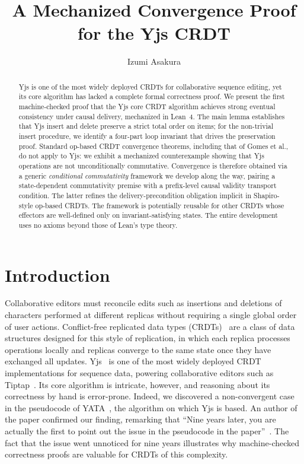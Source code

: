 \documentclass[sigplan,screen]{acmart}
\author{Izumi Asakura}
\begin{document}
\title{A Mechanized Convergence Proof for the Yjs CRDT}

\begin{abstract}
Yjs is one of the most widely deployed CRDTs for collaborative sequence
editing, yet its core algorithm has lacked a complete formal correctness
proof.  We present the first machine-checked proof that the Yjs core
CRDT algorithm achieves strong eventual consistency under causal
delivery, mechanized in Lean~4.  The main lemma establishes that Yjs
insert and delete preserve a strict total order on items; for the
non-trivial insert procedure, we identify a four-part loop invariant
that drives the preservation proof.  Standard op-based CRDT convergence
theorems, including that of Gomes et al., do not apply to Yjs: we
exhibit a mechanized counterexample showing that Yjs operations are
not unconditionally commutative.  Convergence is therefore obtained via
a generic \emph{conditional commutativity} framework we develop along
the way, pairing a state-dependent commutativity premise with a
prefix-level causal validity transport condition.  The latter refines
the delivery-precondition obligation implicit in Shapiro-style op-based
CRDTs.  The framework is potentially reusable for other CRDTs whose
effectors are well-defined only on invariant-satisfying states.  The
entire development uses no axioms beyond those of Lean's type theory.
\end{abstract}

\maketitle

\section{Introduction}
\label{sec:intro}

Collaborative editors must reconcile edits such as insertions and
deletions of characters performed at different replicas without
requiring a single global order of user actions.  Conflict-free
replicated data types (CRDTs)~\cite{Shapiro2011} are a class of data
structures designed for this style of replication, in which each
replica processes operations locally and replicas converge to the same
state once they have exchanged all updates.  Yjs~\cite{Yjs2023} is one
of the most widely deployed CRDT implementations for sequence data,
powering collaborative editors such as Tiptap~\cite{TipTap2024}.  Its
core algorithm is intricate, however, and reasoning about its
correctness by hand is error-prone.  Indeed, we discovered a
non-convergent case in the pseudocode of YATA~\cite{Nicolaescu2016},
the algorithm on which Yjs is based.  An author of the paper confirmed
our finding, remarking that ``Nine years later, you are actually the
first to point out the issue in the pseudocode in the
paper''~\cite{YjsBugDiscussion2024}.  The fact that the issue went
unnoticed for nine years illustrates why machine-checked correctness
proofs are valuable for CRDTs of this complexity.
\end{document}
